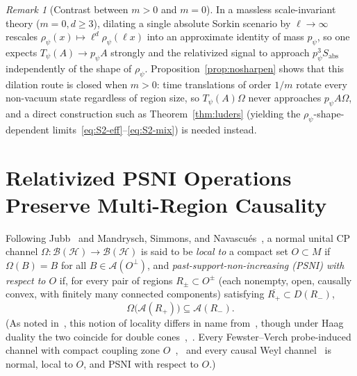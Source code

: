 \documentclass[11pt,a4paper]{article}
\theoremstyle{definition}
\theoremstyle{remark}
\newtheorem{remark}[theorem]{Remark}
\newcommand{\HH}{\mathcal{H}}
\newcommand{\BB}{\mathcal{B}}
\newcommand{\Ac}{\mathcal{A}}
\begin{document}
\begin{remark}[Contrast between $m>0$ and $m=0$]\label{rem:mass-vs-massless}
In a massless scale-invariant theory ($m=0, d\ge 3$), dilating a single absolute Sorkin scenario by $\ell\to\infty$ rescales $\rho_\psi(x)\mapsto \ell^d\rho_\psi(\ell x)$ into an approximate identity of mass $p_\psi$, so one expects $T_\psi(A)\to p_\psi A$ strongly and the relativized signal to approach $p_\psi^3 S_{\mathrm{abs}}$ independently of the shape of $\rho_\psi$. Proposition~\ref{prop:nosharpen} shows that this dilation route is closed when $m>0$: time translations of order $1/m$ rotate every non-vacuum state regardless of region size, so $T_\psi(A)\Omega$ never approaches $p_\psi A\Omega$, and a direct construction such as Theorem~\ref{thm:luders} (yielding the $\rho_\psi$-shape-dependent limits~\eqref{eq:S2-eff}--\eqref{eq:S2-mix}) is needed instead.
\end{remark}

\section{Relativized PSNI Operations Preserve Multi-Region Causality}
\label{sec:psni}

Following Jubb~\cite{Jubb2022} and Mandrysch, Simmons, and Navascu\'es~\cite[Sec.~II.E]{Mandrysch2026}, a normal unital CP channel $\Omega:\BB(\HH)\to\BB(\HH)$ is said to be \emph{local to} a compact set $O\subset M$ if $\Omega(B) = B$ for all $B\in\Ac(O^\perp)$, and \emph{past-support-non-increasing (PSNI) with respect to $O$} if, for every pair of regions $R_\pm\subset O^\pm$ (each nonempty, open, causally convex, with finitely many connected components) satisfying $\overline{R_+}\subset D(R_-)$,
\begin{equation}\label{eq:psni}
\Omega\bigl(\Ac(R_+)\bigr) \subseteq \Ac(R_-).
\end{equation}
(As noted in~\cite[Sec.~4]{FewsterLoveridge2026}, this notion of locality differs in name from~\cite[Def.~4.3]{FewsterLoveridge2026}, though under Haag duality the two coincide for double cones~\cite[Rem.~4.5]{FewsterLoveridge2026},~\cite[Prop.~49]{Mandrysch2026}. Every Fewster--Verch probe-induced channel with compact coupling zone $O$~\cite{FewsterVerch2020},~\cite[Sec.~II.F]{Mandrysch2026} and every causal Weyl channel~\cite[Thm.~17]{Mandrysch2026} is normal, local to $O$, and PSNI with respect to $O$.)
\end{document}
